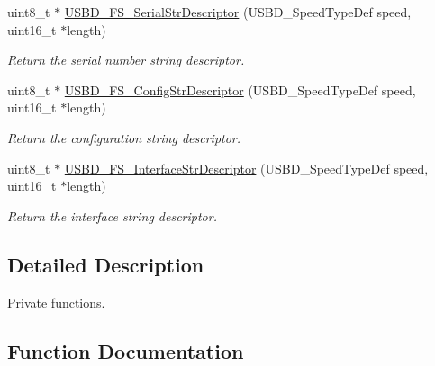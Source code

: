 \begin{DoxyCompactItemize}
uint8\+\_\+t $\ast$ \hyperlink{group__USBD__DESC__Private__Functions_gaad2a1d1451821845eda602a82b1cd213}{U\+S\+B\+D\+\_\+\+F\+S\+\_\+\+Serial\+Str\+Descriptor} (U\+S\+B\+D\+\_\+\+Speed\+Type\+Def speed, uint16\+\_\+t $\ast$length)
\begin{DoxyCompactList}\small\item\em Return the serial number string descriptor. \end{DoxyCompactList}\item 
uint8\+\_\+t $\ast$ \hyperlink{group__USBD__DESC__Private__Functions_ga40ed2a0fb60c50a285983a09ba6921d6}{U\+S\+B\+D\+\_\+\+F\+S\+\_\+\+Config\+Str\+Descriptor} (U\+S\+B\+D\+\_\+\+Speed\+Type\+Def speed, uint16\+\_\+t $\ast$length)
\begin{DoxyCompactList}\small\item\em Return the configuration string descriptor. \end{DoxyCompactList}\item 
uint8\+\_\+t $\ast$ \hyperlink{group__USBD__DESC__Private__Functions_gab248f43276f92d982ab5853111e4fb10}{U\+S\+B\+D\+\_\+\+F\+S\+\_\+\+Interface\+Str\+Descriptor} (U\+S\+B\+D\+\_\+\+Speed\+Type\+Def speed, uint16\+\_\+t $\ast$length)
\begin{DoxyCompactList}\small\item\em Return the interface string descriptor. \end{DoxyCompactList}\end{DoxyCompactItemize}


\subsection{Detailed Description}
Private functions. 



\subsection{Function Documentation}
\mbox{\label{group__USBD__DESC__Private__Functions_ga40ed2a0fb60c50a285983a09ba6921d6}} 
